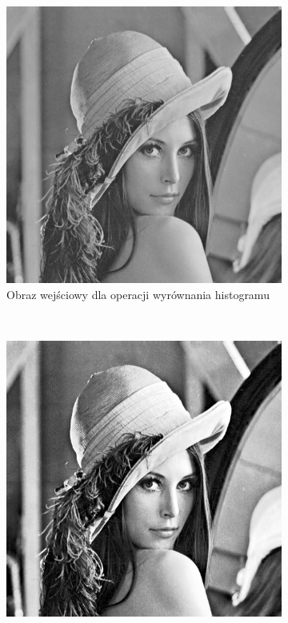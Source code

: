 \begin{figure}
  \centering
  \begin{subfigure}[b]{0.45\textwidth}
    \includegraphics[width=\textwidth]{img/equalize-histogram-before}
    \caption{Obraz wejściowy dla operacji wyrównania histogramu}
    \label{fig:equalize_histogram_before}
  \end{subfigure}
  ~
  \begin{subfigure}[b]{0.45\textwidth}
    \includegraphics[width=\textwidth]{img/equalize-histogram-after}

\end{subfigure}
\end{figure}
